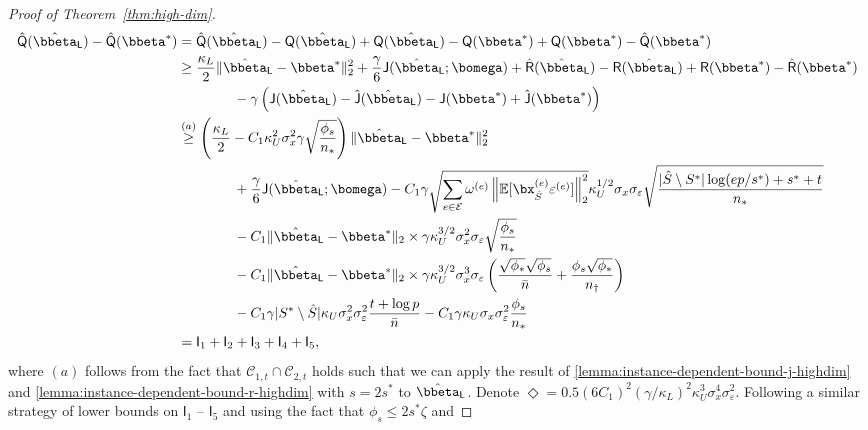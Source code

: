 \documentclass[10pt]{article}
\numberwithin{equation}{section}
\begin{document}
\begin{proof}[Proof of Theorem~\ref{thm:high-dim}]
\begin{align*}
    \hat{\mathsf{Q}}(\hat{\bbeta}_{\mathsf{L}}) - \hat{\mathsf{Q}}(\bbeta^*) &= \hat{\mathsf{Q}}(\hat{\bbeta}_{\mathsf{L}}) - \mathsf{Q}(\hat{\bbeta}_{\mathsf{L}}) + \mathsf{Q}(\hat{\bbeta}_{\mathsf{L}}) - \mathsf{Q}(\bbeta^*) + \mathsf{Q}(\bbeta^*) - \hat{\mathsf{Q}}(\bbeta^*) \\
    &\ge \frac{\kappa_L}{2} \|\hat{\bbeta}_{\mathsf{L}} - \bbeta^*\|_2^2 + \frac{\gamma}{6} \mathsf{J}(\hat{\bbeta}_{\mathsf{L}};\bomega) + \hat{\mathsf{R}}(\hat{\bbeta}_{\mathsf{L}}) - \mathsf{R}(\hat{\bbeta}_{\mathsf{L}}) + \mathsf{R} (\bbeta^*) - \hat{\mathsf{R}} (\bbeta^*) \\
    & ~~~~~~~~~~~~ - \gamma \left(\mathsf{J}(\hat{\bbeta}_{\mathsf{L}}) - \hat{\mathsf{J}}(\hat{\bbeta}_{\mathsf{L}}) - \mathsf{J}(\bbeta^*) + \hat{\mathsf{J}}(\bbeta^*)\right)\\
    &\overset{(a)}{\ge} \left(\frac{\kappa_L}{2} - C_1 \kappa_U^2\sigma_x^2 \gamma \sqrt{\frac{\phi_s}{n_*}}\right) \|\hat{\bbeta}_{\mathsf{L}} - \bbeta^*\|_2^2 \\
    & ~~~~~~~~~~~~ + \frac{\gamma}{6} \mathsf{J}(\hat{\bbeta}_{\mathsf{L}};\bomega) - C_1 \gamma \sqrt{\sum_{e\in \mathcal{E}} \omega^{(e)} \left\|\mathbb{E}[\bx_{\hat{S}}^{(e)} \varepsilon^{(e)}]\right\|_2^2} \kappa_U^{1/2} \sigma_x\sigma_\varepsilon \sqrt{\frac{|\hat{S}\setminus S^*|\log (ep/s^*)+s^* + t}{n_*}} \\
    & ~~~~~~~~~~~~ - C_1 \|\hat{\bbeta}_{\mathsf{L}} - \bbeta^*\|_2 \times \gamma \kappa_U^{3/2} \sigma_x^2 \sigma_\varepsilon \sqrt{\frac{\phi_s}{n_*}} \\
    & ~~~~~~~~~~~~ - C_1 \|\hat{\bbeta}_{\mathsf{L}} - \bbeta^*\|_2 \times \gamma \kappa_U^{3/2} \sigma_x^3 \sigma_\varepsilon \left(\frac{\sqrt{\phi_*} \sqrt{\phi_s}}{\bar{n}} + \frac{\phi_s \sqrt{\phi_*}}{n_\dagger} \right) \\
    & ~~~~~~~~~~~~ - C_1 \gamma |S^*\setminus \hat{S}| \kappa_U \sigma_x^2 \sigma_\varepsilon^2 \frac{t+ \log p}{\bar{n}} - C_1 \gamma \kappa_U \sigma_x \sigma_\varepsilon^2 \frac{\phi_s}{n_*} \\
    &= \mathsf{I}_1 + \mathsf{I}_2 + \mathsf{I}_3 + \mathsf{I}_4 + \mathsf{I}_5,
\end{align*} where $(a)$ follows from the fact that $\mathcal{C}_{1,t} \cap \mathcal{C}_{2,t}$ holds such that we can apply the result of \cref{lemma:instance-dependent-bound-j-highdim} and \cref{lemma:instance-dependent-bound-r-highdim} with $s=2s^*$ to $\hat{\bbeta}_{\mathsf{L}}$. Denote $\Diamond=0.5 (6C_1)^2 (\gamma/\kappa_L)^2 \kappa_U^3 \sigma_x^4\sigma_\varepsilon^2$. Following a similar strategy of lower bounds on $\mathsf{I}_1$ -- $\mathsf{I}_5$ and using the fact that $\phi_s \le 2s^*\zeta$ and

\end{proof}
\end{document}
